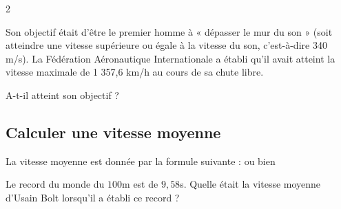 \documentclass[a4paper,10pt]{report}
\begin{document}
\begin{multicols}{2}
\begin{ex}
\noindent Son objectif était d'être le premier homme à « dépasser le mur du son » (soit atteindre une vitesse supérieure ou égale à la vitesse du son, c'est-à-dire 340 m/s). La Fédération Aéronautique Internationale a établi qu'il avait atteint la vitesse maximale de 1 357,6 km/h au cours de sa chute libre.

\noindent A-t-il atteint son objectif ?

\medskip
\noindent\grandscarreaux{\linewidth}{0.8cm}
\end{ex}

\vspace{-2mm}
\subsection{Calculer une vitesse moyenne}

\vspace{-2mm}
\begin{defn}
La vitesse moyenne est donnée par la formule suivante : \hspace{2cm} ou bien

\medskip
\end{defn}

\begin{ex}
Le record du monde du $100$m est de $9,58$s. Quelle était la vitesse moyenne d’Usain Bolt lorsqu'il a établi ce record ?

\medskip
\noindent\grandscarreaux{\linewidth}{0.8cm}
\end{ex}

\end{multicols}
\end{document}
